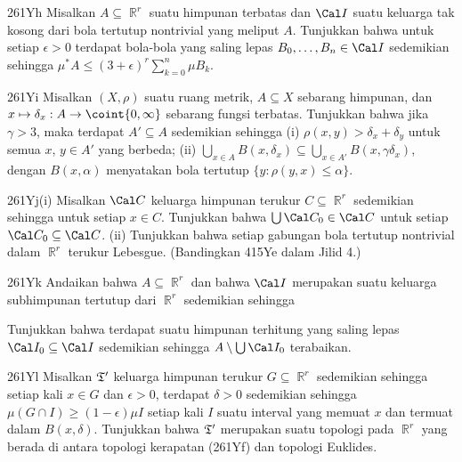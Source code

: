 {\spheader 261Yh Misalkan $A\subseteq\BbbR^r$ suatu himpunan terbatas dan 
$\Cal I$ suatu keluarga tak kosong dari bola tertutup nontrivial yang meliput 
$A$. Tunjukkan bahwa untuk setiap $\epsilon>0$ terdapat bola-bola yang saling 
lepas $B_0,\ldots,B_n\in\Cal I$ sedemikian sehingga 
$\mu^*A\le(3+\epsilon)^r\sum_{k=0}^n\mu B_k$. 
      
\spheader 261Yi Misalkan $(X,\rho)$ suatu ruang metrik, 
$A\subseteq X$ sebarang himpunan, dan 
$x\mapsto\delta_x:A\to\coint{0,\infty}$ sebarang fungsi terbatas. 
Tunjukkan bahwa jika $\gamma>3$, maka terdapat $A'\subseteq A$ sedemikian 
sehingga (i) $\rho(x,y)>\delta_x+\delta_y$ untuk semua $x$, $y\in A'$ yang 
berbeda; (ii) 
$\bigcup_{x\in A}B(x,\delta_x) 
\subseteq\bigcup_{x\in A'}B(x,\gamma\delta_x)$, dengan $B(x,\alpha)$ 
menyatakan bola tertutup $\{y:\rho(y,x)\le\alpha\}$. 
      
\spheader 261Yj(i) Misalkan $\Cal C$ keluarga himpunan terukur 
$C\subseteq\BbbR^r$ sedemikian sehingga 
untuk setiap $x\in C$. 
Tunjukkan bahwa $\bigcup\Cal C_0\in\Cal C$ untuk setiap 
$\Cal C_0\subseteq\Cal C$.    
(ii) Tunjukkan bahwa setiap gabungan bola tertutup nontrivial dalam 
$\BbbR^r$ terukur Lebesgue. (Bandingkan 415Ye dalam Jilid 4.) 
      
\spheader 261Yk Andaikan bahwa $A\subseteq\BbbR^r$ dan bahwa $\Cal I$ 
merupakan suatu keluarga subhimpunan tertutup dari $\BbbR^r$ sedemikian 
sehingga 
      
      
\noindent Tunjukkan bahwa terdapat suatu himpunan terhitung yang saling lepas 
$\Cal I_0\subseteq\Cal I$ sedemikian sehingga 
$A\setminus\bigcup\Cal I_0$ terabaikan. 
 
\spheader 261Yl Misalkan $\frak T'$ keluarga himpunan terukur 
$G\subseteq\BbbR^r$ sedemikian sehingga setiap kali $x\in G$ dan 
$\epsilon>0$, terdapat $\delta>0$ sedemikian sehingga 
$\mu(G\cap I)\ge(1-\epsilon)\mu I$ setiap kali $I$ suatu interval yang memuat 
$x$ dan termuat dalam $B(x,\delta)$. Tunjukkan bahwa 
$\frak T'$ merupakan suatu topologi pada $\BbbR^r$ yang berada di antara 
topologi kerapatan (261Yf) dan topologi Euklides. 
}%
      
